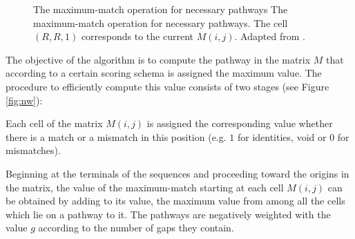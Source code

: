 \begin{figure}[t!]
\begin{center}
\setlength{\fboxsep}{0pt}
          {The maximum-match operation for necessary pathways}%
          {The maximum-match operation for necessary pathways.}%
          {The cell $(R,R,1)$ corresponds to the current $M(i,j)$. Adapted from \citet{needleman:1970a}.}
\end{center}
\end{figure}


The objective of the algorithm is to compute the pathway in the matrix $M$ that according to a certain
scoring schema is assigned the maximum value. The procedure to efficiently compute this value consists 
of two stages (see Figure \ref{fig:nw}):
\begin{menumerate}
\item
Each cell of the matrix $M(i,j)$ is assigned the corresponding value whether there is a match or a 
mismatch in this position (e.g. $1$ for identities, void or $0$ for mismatches).
\item
Beginning at the terminals of the sequences and proceeding toward the origins in the matrix, the value 
of the maximum-match starting at each cell $M(i,j)$ can be obtained by adding to its value, the maximum
value from among all the cells which lie on a pathway to it. The pathways are negatively weighted with the 
value $g$ according to the number of gaps they contain. 
\end{menumerate}

\begin{center}
\end{center}

